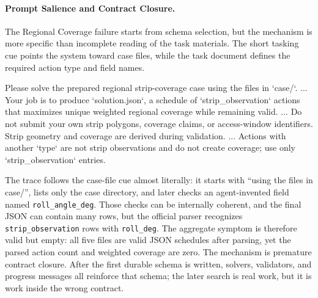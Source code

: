 \documentclass[11pt]{article}
\newenvironment{promptblock}
  {\VerbatimEnvironment\par\smallskip\Needspace{10\baselineskip}\noindent\begin{promptblockinner}}
  {\end{promptblockinner}\par\smallskip}
\begin{document}
\paragraph{Prompt Salience and Contract Closure.} The Regional Coverage failure starts from schema selection, but the mechanism is more specific than incomplete reading of the task materials. The short tasking cue points the system toward case files, while the task document defines the required action type and field names.
\begin{promptblock}
Please solve the prepared regional strip-coverage case using the files in `case/`.
...
Your job is to produce `solution.json`, a schedule of `strip_observation`
actions that maximizes unique weighted regional coverage while remaining valid.
...
Do not submit your own strip polygons, coverage claims, or access-window
identifiers. Strip geometry and coverage are derived during validation.
...
Actions with another `type` are not strip observations and do not create
coverage; use only `strip_observation` entries.
\end{promptblock}
The trace follows the case-file cue almost literally: it starts with ``using the files in case/'', lists only the case directory, and later checks an agent-invented field named \texttt{roll\_angle\_deg}. Those checks can be internally coherent, and the final JSON can contain many rows, but the official parser recognizes \texttt{strip\_observation} rows with \texttt{roll\_deg}. The aggregate symptom is therefore valid but empty: all five files are valid JSON schedules after parsing, yet the parsed action count and weighted coverage are zero. The mechanism is premature contract closure. After the first durable schema is written, solvers, validators, and progress messages all reinforce that schema; the later search is real work, but it is work inside the wrong contract.
\end{document}
